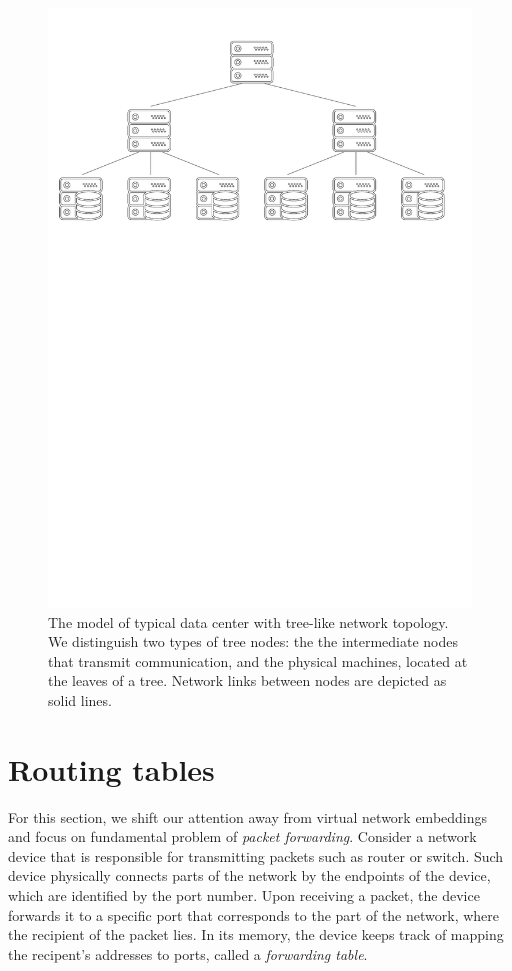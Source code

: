 \begin{figure}[h]
\centering
\includegraphics[width=0.79\columnwidth]{figs/tree-topology.pdf}
\caption{The model of typical data center with tree-like network topology. We distinguish two types of tree nodes: the the intermediate nodes that transmit communication, and the physical machines, located at the leaves of a tree. Network links between nodes are depicted as solid lines.}\label{fig:tree-topology}
\vspace{-1em}
\end{figure}

\section{Routing tables}

For this section, we shift our attention away from virtual network embeddings and focus on fundamental problem of \emph{packet forwarding}.
Consider a network device that is responsible for transmitting packets such as router or switch.
Such device physically connects parts of the network by the endpoints of the device, which are identified by the port number.
Upon receiving a packet, the device forwards it to a specific port that corresponds to the part of the network, where the recipient of the packet lies.
In its memory, the device keeps track of mapping the recipent's addresses to ports, called a \emph{forwarding table}.

